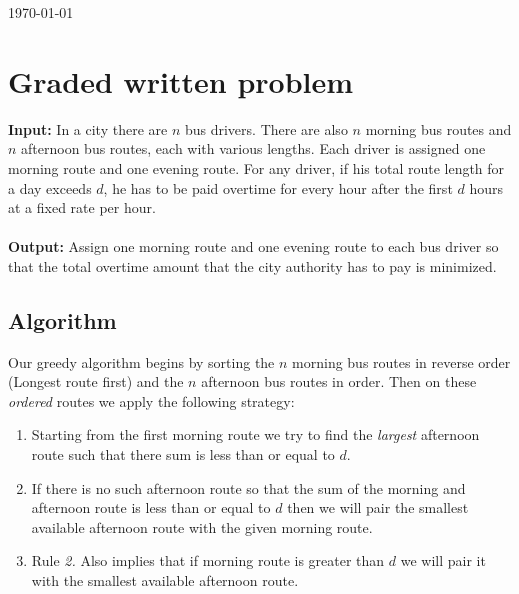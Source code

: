 \documentclass[8pt]{article}
\begin{document}
\hfill \small{\today} \\
\setlength{\fboxrule}{.5mm}\setlength{\fboxsep}{1.2mm}
\newlength{\boxlength}\setlength{\boxlength}{\textwidth}
\addtolength{\boxlength}{-4mm}
\begin{center}\end{center}
\vspace{5mm}

\section{Graded written problem}

\textbf{Input:} In a city there are $n$ bus drivers. There are also $n$ morning bus routes and $n$ afternoon bus routes, each with various lengths. Each driver is assigned one morning route
and one evening route. For any driver, if his total route length for a day exceeds $d$, he has to
be paid overtime for every hour after the first $d$ hours at a fixed rate per hour.
\\ \\
\textbf{Output:} Assign one morning route and one evening route to each bus driver so that the total overtime amount that the city authority has to pay is minimized.

\subsection{Algorithm}
Our greedy algorithm begins by sorting the $n$ morning bus routes in reverse order (Longest route first) and the $n$ afternoon bus routes in order. Then on these \textit{ordered} routes we apply the following strategy:
\begin{enumerate}
    \item Starting from the first morning route we try to find the \textit{largest} afternoon route such that there sum is less than or equal to $d$. 
    \item If there is no such afternoon route so that the sum of the morning and afternoon route is less than or equal to $d$ then we will pair the smallest available afternoon route with the given morning route.
    \item Rule \textit{2.} Also implies that if morning route is greater than $d$ we will pair it with the smallest available afternoon route.
\end{enumerate}
\end{document}
